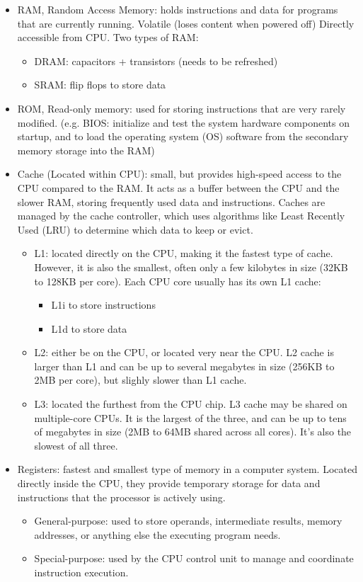 \begin{itemize}
    \item RAM, Random Access Memory: holds instructions and data 
for programs that are currently running. Volatile (loses content when powered off) Directly accessible from CPU. Two types of RAM:
	\begin{itemize}
		\item DRAM: capacitors + transistors (needs to be refreshed)
		\item SRAM: flip flops to store data
	\end{itemize}
    \item ROM, Read-only memory: used for storing instructions that are very rarely modified. (e.g. BIOS: initialize and test the system hardware components on startup, and to load the operating system (OS) software from the secondary memory storage into the RAM) 
    \item Cache (Located within CPU): small, but provides high-speed access to the CPU compared to the RAM. It acts as a buffer between the CPU and the slower RAM, storing frequently used data and instructions. Caches are managed by the cache controller, which uses algorithms like Least Recently Used (LRU) to determine which data to keep or evict.
    \begin{itemize}
        \item L1: located directly on the CPU, making it the fastest type of cache. However, it is also the smallest, often only a few kilobytes in size (32KB to 128KB per core). Each CPU core usually has its own L1 cache:
		\begin{itemize}
			\item L1i to store instructions
			\item L1d to store data
		\end{itemize}
        \item L2: either be on the CPU, or located very near the CPU. L2 cache 
is larger than L1 and can be up to several megabytes in size (256KB to 2MB per core), but slighly slower than L1 cache.
        \item L3: located the furthest from the CPU chip. L3 cache may be shared on multiple-core CPUs. It is the largest of the three, and can be up to tens of megabytes in size (2MB to 64MB shared across all cores). It's also the slowest of all three.
    \end{itemize}
	\item Registers: fastest and smallest type of memory in a computer system. Located directly inside the CPU, they provide temporary storage for data and instructions that the processor is actively using.
\begin{itemize}
\item General-purpose: used to store operands, intermediate results, memory addresses, or anything else the executing program needs.
\item Special-purpose: used by the CPU control unit to manage and coordinate instruction execution. 
\end{itemize}
\end{itemize}
